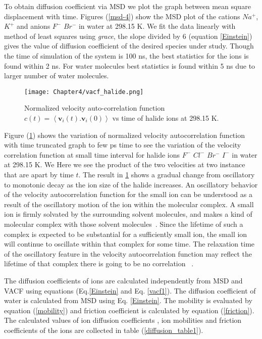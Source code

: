  To obtain diffusion coefficient via MSD we plot the graph between mean square displacement with time. Figures (\ref{msd-4}) show the MSD plot of the cations $Na^+$, $K^+$  and anions $F^-$ $Br^-$ in water  at 298.15 K. We  fit the data linearly with method of least squares  using \emph{grace}, the slope divided by 6 (equation \ref{Einstein}) gives the value of diffusion coefficient of the desired species under study. Though the time of simulation of the system is 100 ns, the best statistics for the ions  is found within 2 ns. For water molecules best statistics is found within 5 ns due to larger number of water molecules.

\begin{figure}[h!]
 \centering
\texttt{[image: Chapter4/vacf\_halide.png]}
\caption[Normalized velocity auto-correlation function   vs  time of halide ions.] { Normalized velocity auto-correlation function  $ c (t) = \left\langle  \textbf{v}_i(t).\textbf{v}_i(0) \right\rangle $ vs   time of halide ions at 298.15 K. }
\label{normalize_velacc}
\end{figure}

 Figure (\ref{normalize_velacc}) shows the variation of  normalized velocity autocorrelation function with time  truncated graph to few ps time to see the variation of the velocity correlation function at small time interval for halide ions $F^-$ $Cl^-$ $Br^-$ $I^-$ in water at 298.15 K.  We Here  we see  the product of the two velocities at two instance
that are apart by time $t$. The result in \ref{normalize_velacc} 
shows a gradual change from oscillatory to monotonic decay as the ion size of the halide increases. An oscillatory behavior of the velocity autocorrelation function for the small ion can be understood as a result of the oscillatory motion of the ion within the molecular complex. A small ion is firmly solvated by the surrounding solvent molecules, and makes a kind of molecular complex with those solvent molecules~\citep{tobias2001surface}. Since the lifetime of such a complex is expected to be substantial for a sufficiently small ion, the small ion will continue to oscillate within that complex for some time. The relaxation time of the oscillatory feature in the velocity autocorrelation function may reflect the lifetime of that complex there is going to be no correlation~ \citep{chong1999dynamics, koneshan1998solvent}.  

 The diffusion coefficients of ions  are calculated independently from MSD and VACF using  equations (Eq.\ref{Einstein} and Eq. \ref{vacf1}). The diffusion coefficient of water is calculated from MSD using Eq. \ref{Einstein}. The  mobility is evaluated by equation (\ref{mobility}) and friction coefficient is calculated by equation (\ref{friction}). The calculated values of  ion diffusion coefficients , ion mobilities and friction coefficients of the ions are collected in table (\ref{diffusion_table1}). 
 
